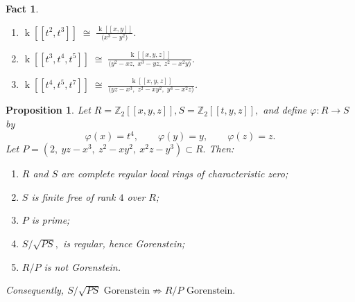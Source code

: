 \documentclass[10pt,a4paper]{amsart}
\newtheorem{fact}[theorem]{Fact}
\newtheorem{proposition}[theorem]{Proposition}
\newcommand{\kk}{\operatorname{k}}
\begin{document}
\begin{fact}\label{rel} 	\begin{enumerate}
\item[(i)] \(\kk[[t^2,t^3]] \;\cong\; \frac{\kk[[x,y]]}{\bigl(x^3-y^2 \bigr)}\).
\item[(ii)] 
\(\kk[[t^3,t^4,t^5]] \;\cong\; \frac{\kk[[x,y,z]]}{\bigl(y^2 - xz,\; x^3 - yz,\; z^2 - x^2 y\bigr)}\).
\item[(iii)]
\(\kk[[t^4,t^5,t^7]] \;\cong\; \frac{\kk[[x,y,z]]}{\bigl(yz - x^3,\; z^2 - xy^2,\; y^3 - x^2 z\bigr)}\).
 		\end{enumerate}

 	\end{fact}

 \begin{proposition}
 	Let
 	\(
 	R=\mathbb Z_2[[x,y,z]],
 	S=\mathbb Z_2[[t,y,z]],
 	\)
 	and define
 	\(
 	\varphi:R\to S
 	\)
 	by
 	\[
 	\varphi(x)=t^4,\qquad
 	\varphi(y)=y,\qquad
 	\varphi(z)=z.
 	\]
 	Let
 	\(
 	P=(2,\ yz-x^3,\ z^2-xy^2,\ x^2z-y^3)\subset R.
 	\)
 	Then:
 	\begin{enumerate}
 		\item $R$ and $S$ are complete regular local rings of characteristic
 		zero;
 		\item $S$ is finite free of rank $4$ over $R$;
 		\item $P$ is prime;
 	\item
 		\(
 		S/\sqrt{PS},
 		\)
 	 is regular, hence Gorenstein;
 		\item $R/P$ is not Gorenstein.
 	\end{enumerate}
 	Consequently,
 	\(
 	{
 		S/\sqrt{PS}\text{ Gorenstein}
 		\not\Longrightarrow
 		R/P\text{ Gorenstein}.
 	}
 	\)
 \end{proposition}
\end{document}
